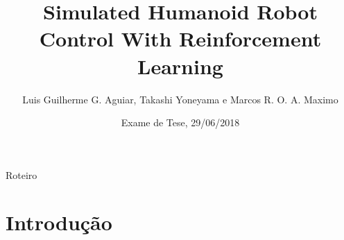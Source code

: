 \documentclass{beamer}
\title[Simulated Humanoid Robot Control With Reinforcement Learning] %
{Simulated Humanoid Robot Control With Reinforcement Learning}%
\author %
{Luis Guilherme G. Aguiar\inst{1}, Takashi Yoneyama \inst{1} e Marcos R. O. A. Maximo \inst{2}}
\institute[Instituto Tecnológico de Aeronáutica (ITA)] %
{
\inst{1}%
  Divisão de Engenharia Eletrônica, Instituto Tecnológico de Aeronáutica (ITA) \\
\inst{2}%
  Laboratório de Sistemas Computacionais Autônomos (LAB-SCA), Divisão de Ciência da Computação (IEC), Instituto Tecnológico de Aeronáutica (ITA)
}
\date %
{Exame de Tese, 29/06/2018}
\begin{document}
\newcommand{\originalsystem}[1][]{ %
\scalebox{0.8} {
	\begin{tikzpicture}[auto, node distance=3.5cm, scale = 0.9, every node/.style={transform shape}]
    		\node [input, name=input] {};
    		\node [block, right of=input] (system) {$f$};
    		\node [output, right of=system] (output) {};

    		\draw [draw,->] (input) -- node {$ \upsilon_2^i $} (system);
    		\draw [->] (system) -- node [name=y] {$ \dfrac{\partial{\tilde{\lambda}_2}}{\partial{p_i}} $}(output);
	
	\end{tikzpicture}
	}
}

\newcommand{\modifiedsystem}[1][]{
\scalebox{0.8} {
	\begin{tikzpicture}[auto, node distance=3.5 cm, scale = 0.9, every node/.style={transform shape}]     
		\node [input, name=input] {};
    		\node [block, right of=input] (system) {$f$};
    		\node [block, right of=system] (delay) {$\delta$};
    		\node [output, right of=delay] (output) {};

    		\draw [draw,->] (input) -- node {$ \upsilon_2^i $} (system);
   		\draw [->] (system) --node [name=y2] {$  $}(delay);
    		\draw [->] (delay) --node [name=y4] {$ \dfrac{\partial{\tilde{\lambda}_2}}{\partial{p_i}} $} (output);
	\end{tikzpicture}
	}
}


\begin{frame}
  \titlepage
\end{frame}

\begin{frame}{Roteiro}
  \tableofcontents
\end{frame}

\section{Introdução}
\end{document}
